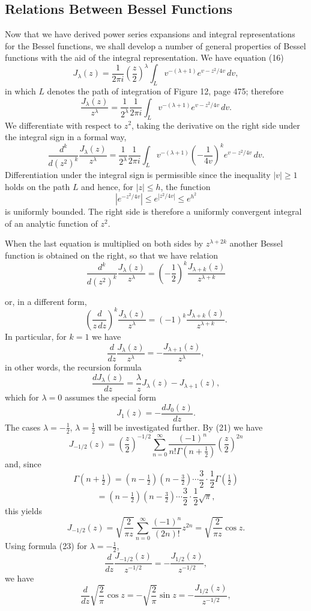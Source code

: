 \subsection{Relations Between Bessel Functions}
Now that we have derived power series expansions and integral representations for the Bessel functions, we shall develop a number of general properties of Bessel functions with the aid of the integral representation. We have equation (16)
\[
J_\lambda(z)=\frac1{2\pi i}\left(\frac z2\right)^\lambda
\int_Lv^{-(\lambda+1)}e^{v-z^2/4v}\,dv,
\]
in which $L$ denotes the path of integration of Figure 12, page 475; therefore
\[
\frac{J_\lambda(z)}{z^\lambda}=\frac1{2^\lambda}\frac1{2\pi i}
\int_Lv^{-(\lambda+1)}e^{v-z^2/4v}\,dv.
\]
We differentiate with respect to $z^2$, taking the derivative on the right side under the integral sign in a formal way,
\[
\frac{d^k}{d(z^2)^k}\frac{J_\lambda(z)}{z^\lambda}
=\frac1{2^\lambda}\frac1{2\pi i}\int_Lv^{-(\lambda+1)}
\left(-\frac1{4v}\right)^k e^{v-z^2/4v}\,dv.
\]
Differentiation under the integral sign is permissible since the inequality $|v|\ge1$ holds on the path $L$ and hence, for $|z|\le h$, the function
\[
\left|e^{-z^2/4v}\right|\le e^{|z^2/4v|}\le e^{h^2}
\]
is uniformly bounded. The right side is therefore a uniformly convergent integral of an analytic function of $z^2$.

When the last equation is multiplied on both sides by $z^{\lambda+2k}$ another Bessel function is obtained on the right, so that we have relation
\begin{equation}\tag{22}
\frac{d^k}{d(z^2)^k}\frac{J_\lambda(z)}{z^\lambda}
=\left(-\frac12\right)^k\frac{J_{\lambda+k}(z)}{z^{\lambda+k}}
\end{equation}

or, in a different form,
\[
\left(\frac d{z\,dz}\right)^k\frac{J_\lambda(z)}{z^\lambda}
=(-1)^k\frac{J_{\lambda+k}(z)}{z^{\lambda+k}}.
\]
In particular, for $k=1$ we have
\begin{equation}\tag{23}
\frac d{dz}\frac{J_\lambda(z)}{z^\lambda}=-\frac{J_{\lambda+1}(z)}{z^\lambda},
\end{equation}
in other words, the recursion formula
\begin{equation}\tag{24}
\frac{dJ_\lambda(z)}{dz}=\frac\lambda zJ_\lambda(z)-J_{\lambda+1}(z),
\end{equation}
which for $\lambda=0$ assumes the special form
\[
J_1(z)=-\frac{dJ_0(z)}{dz}.
\]
The cases $\lambda=-\tfrac12$, $\lambda=\tfrac12$ will be investigated further. By (21) we have
\[
J_{-1/2}(z)=\left(\frac z2\right)^{-1/2}
\sum_{n=0}^{\infty}\frac{(-1)^n}{n!\Gamma(n+\tfrac12)}\left(\frac z2\right)^{2n}
\]
and, since
\[
\Gamma\left(n+\tfrac12\right)=\left(n-\tfrac12\right)\left(n-\tfrac32\right)\cdots\frac32\cdot\frac12\Gamma\left(\tfrac12\right)
\]
\[
=\left(n-\tfrac12\right)\left(n-\tfrac32\right)\cdots\frac32\cdot\frac12\sqrt\pi,
\]
this yields
\[
J_{-1/2}(z)=\sqrt{\frac2{\pi z}}\sum_{n=0}^{\infty}\frac{(-1)^n}{(2n)!}z^{2n}
=\sqrt{\frac2{\pi z}}\cos z.
\]
Using formula (23) for $\lambda=-\tfrac12$,
\[
\frac d{dz}\frac{J_{-1/2}(z)}{z^{-1/2}}=-\frac{J_{1/2}(z)}{z^{-1/2}},
\]
we have
\[
\frac d{dz}\sqrt{\frac2\pi}\cos z=-\sqrt{\frac2\pi}\sin z=-\frac{J_{1/2}(z)}{z^{-1/2}},
\]

